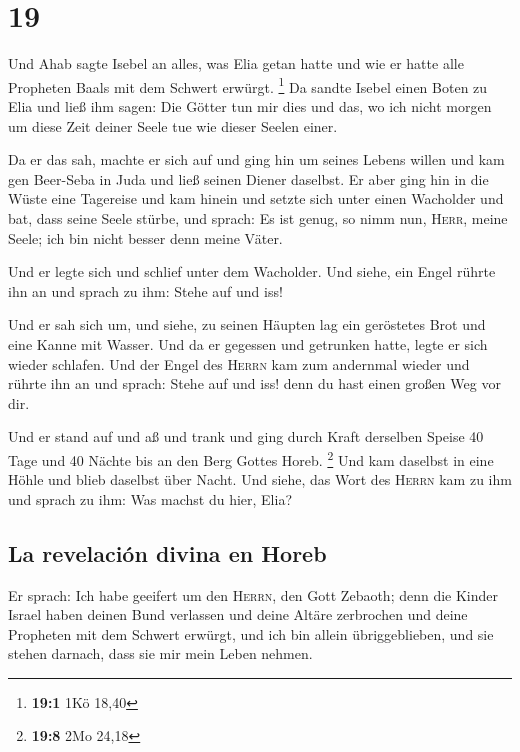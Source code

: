 \hypertarget{section-18}{%
\section{19}\label{section-18}}

 Und Ahab sagte Isebel an alles, was Elia getan hatte und
wie er hatte alle Propheten Baals mit dem Schwert erwürgt. \footnote{\textbf{19:1}
  1Kö 18,40}  Da sandte Isebel einen Boten zu Elia und
ließ ihm sagen: Die Götter tun mir dies und das, wo ich nicht morgen um
diese Zeit deiner Seele tue wie dieser Seelen einer.

 Da er das sah, machte er sich auf und ging hin um seines
Lebens willen und kam gen Beer-Seba in Juda und ließ seinen Diener
daselbst.  Er aber ging hin in die Wüste eine Tagereise
und kam hinein und setzte sich unter einen Wacholder und bat, dass seine
Seele stürbe, und sprach: Es ist genug, so nimm nun, \textsc{Herr},
meine Seele; ich bin nicht besser denn meine Väter.

 Und er legte sich und schlief unter dem Wacholder. Und
siehe, ein Engel rührte ihn an und sprach zu ihm: Stehe auf und iss!

 Und er sah sich um, und siehe, zu seinen Häupten lag ein
geröstetes Brot und eine Kanne mit Wasser. Und da er gegessen und
getrunken hatte, legte er sich wieder schlafen.  Und der
Engel des \textsc{Herrn} kam zum andernmal wieder und rührte ihn an und
sprach: Stehe auf und iss! denn du hast einen großen Weg vor dir.

 Und er stand auf und aß und trank und ging durch Kraft
derselben Speise 40 Tage und 40 Nächte bis an den Berg Gottes Horeb.
\footnote{\textbf{19:8} 2Mo 24,18}  Und kam daselbst in
eine Höhle und blieb daselbst über Nacht. Und siehe, das Wort des
\textsc{Herrn} kam zu ihm und sprach zu ihm: Was machst du hier, Elia?

\hypertarget{la-revelaciuxf3n-divina-en-horeb}{%
\subsection{La revelación divina en
Horeb}\label{la-revelaciuxf3n-divina-en-horeb}}

 Er sprach: Ich habe geeifert um den \textsc{Herrn}, den
Gott Zebaoth; denn die Kinder Israel haben deinen Bund verlassen und
deine Altäre zerbrochen und deine Propheten mit dem Schwert erwürgt, und
ich bin allein übriggeblieben, und sie stehen darnach, dass sie mir mein
Leben nehmen.


